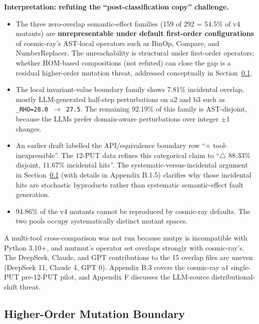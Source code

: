 \documentclass[manuscript,screen,review]{acmart}
\begin{document}
\textbf{Interpretation: refuting the ``post-classification copy''
challenge.}

\begin{itemize}

\item
  The three zero-overlap semantic-effect families (159 of 292 = 54.5\%
  of v4 mutants) are \textbf{unrepresentable under default first-order
  configurations} of
  cosmic-ray's AST-local operators such as BinOp, Compare, and
  NumberReplacer. The unreachability is structural under first-order
  operators; whether HOM-based compositions \citep{jia2008subtle} (not
  refuted) can close the gap is a residual higher-order mutation threat, addressed
  conceptually in Section~\ref{preventive-defence-framing}.
\item
  The local invariant-value boundary family shows 7.81\% incidental
  overlap, mostly LLM-generated
  half-step perturbations on a2 and b3 such as
  \texttt{\_RHO=28.0\ $\to$\ 27.5}. The remaining 92.19\% of this family is
  AST-disjoint, because the LLMs prefer domain-aware perturbations over
  integer $\pm$1 changes.
\item
  An earlier draft labelled the API/equivalence boundary row
  ``$\times$ tool-inexpressible''. The
  12-PUT data refines this categorical claim to ``$\bigtriangleup$ 88.33\% disjoint,
  11.67\% incidental hits''. The systematic-versus-incidental argument
  in Section~\ref{preventive-defence-framing} (with details in Appendix B.1.5) clarifies why those
  incidental hits are stochastic byproducts rather than systematic
  semantic-effect fault generation.
\item
  94.86\% of the v4 mutants cannot be reproduced by cosmic-ray defaults.
  The two pools occupy systematically distinct mutant spaces.
\end{itemize}

A multi-tool cross-comparison was not run because mutpy is incompatible
with Python 3.10+, and mutmut's operator set overlaps strongly with
cosmic-ray's. The DeepSeek, Claude, and GPT contributions to the 15
overlap files are uneven (DeepSeek 11, Claude 4, GPT 0). Appendix B.3
covers the cosmic-ray a1 single-PUT pre-12-PUT pilot, and Appendix F
discusses the LLM-source distributional-shift threat.

\subsection{Higher-Order Mutation Boundary}\label{preventive-defence-framing}
\end{document}
